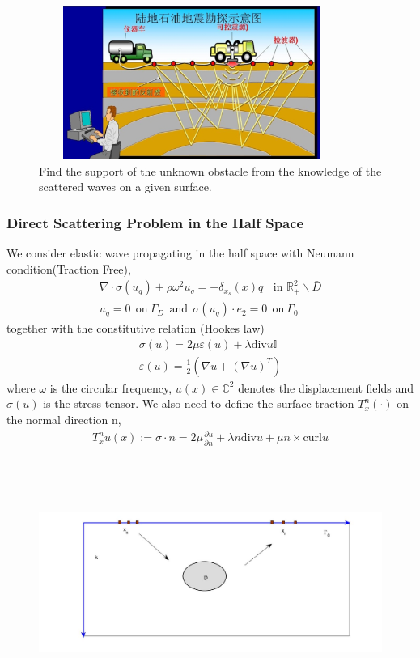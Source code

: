 \documentclass[cjk,8pt]{beamer}
\newcommand{\R}{\mathbb{R}}
\newcommand{\pa}{\partial}
\newcommand{\ep}{\varepsilon}
\newcommand{\na}{\nabla}
\newcommand{\Ga}{\Gamma}
\newcommand{\bks}{\backslash}
\newcommand{\C}{{\mathbb{C}}}
\renewcommand{\div}{\mathrm{div}}
\newcommand{\curl}{\mathrm{curl}}
\newcommand{\ben}{\begin{eqnarray*}}
\newcommand{\een}{\end{eqnarray*}}
\begin{document}
\begin{CJK*}{GBK}{kai}
\begin{frame}
\begin{figure}
  \includegraphics[width=10cm,height=5cm]{./figure/seismic.png}
  \caption{Find the support of the unknown obstacle from the knowledge of the scattered waves on a given surface.}
\end{figure}
\end{frame}
\begin{frame}
\frametitle{Direct Scattering Problem in the Half Space}
We consider elastic wave propagating in the half space with
Neumann condition(Traction Free),
\ben\label{elastic_eq}
\nabla\cdot\sigma(u_q) + \rho\omega^2u_q= -\delta_{x_s}(x)q \ \ \ \ \mbox{in }\R_+^2\bks \bar{D}\\
u_q=0 \ \ \mbox{on} \ \Ga_D  \ \ \mbox{and} \ \ \sigma(u_q)\cdot e_2=0 \ \ \mbox{on} \ \Ga_0
\een
together with the constitutive relation (Hookes law)
\ben
\sigma(u) = 2\mu\ep(u) + \lambda\div u \mathbb{I} \\
\ep(u)=\frac{1}{2}(\na u +(\na u)^T)
\een
where $\omega$ is the circular frequency, $u(x)\in\C^2$ denotes the displacement fields and $\sigma(u)$ is the stress tensor. We also need to define the surface traction $T_x^n (\cdot)$ on the normal direction n,
\ben
T_x^n u(x) := \sigma\cdot n = 2\mu\frac{\pa u}{\pa n}+\lambda n\div u + \mu n \times \curl u
\een
\end{frame}

\begin{frame}
\begin{figure}
  \centering
  \includegraphics[width=12cm,height=8cm]{./figure/half_forward}
\end{figure}
\end{frame}



\end{CJK*}
\end{document}
